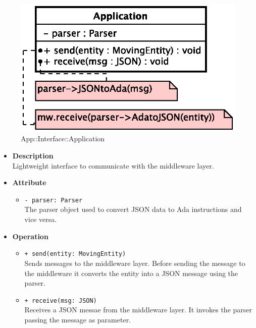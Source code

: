 \begin{figure}[h]
\centering
\includegraphics[scale=0.6,keepaspectratio]{images/solution/application.eps}
\caption{App::Interface::Application}
\label{fig:sd-app-application}
\end{figure}
\FloatBarrier
\begin{itemize}
  \item \textbf{Description} \\
    Lightweight interface to communicate with the middleware layer.
  \item \textbf{Attribute}
  \begin{itemize}
    \item \texttt{- parser: Parser} \\
The parser object used to convert JSON data to Ada instructions and vice versa.
  \end{itemize}
  \item \textbf{Operation}
  \begin{itemize} 
    \item \texttt{+ send(entity: MovingEntity)} \\
Sends messages to the middleware layer. Before sending the message to the
middleware it converts the entity into a JSON message using the parser.
    \item \texttt{+ receive(msg: JSON)} \\
Receives a JSON messae from the middleware layer. It invokes the parser 
passing the message as parameter.
  \end{itemize}
\end{itemize}
